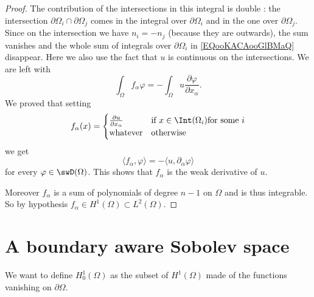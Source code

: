 \begin{proof}
    The contribution of the intersections in this integral is double : the intersection \( \partial\Omega_i\cap\partial\Omega_j\) comes in the integral over \( \partial\Omega_i\) and in the one over \( \partial\Omega_j\). Since on the intersection we have \( n_i=-n_j\) (because they are outwards), the sum vanishes and the whole sum of integrals over \( \partial\Omega_i\) in \eqref{EQooKACAooGlBMaQ} disappear. Here we also use the fact that \( u\) is continuous on the intersections. We are left with
    \begin{equation}
        \int_{\Omega}f_{\alpha}\varphi=-\int_{\Omega}u\frac{ \partial \varphi }{ \partial x_{\alpha} }. 
    \end{equation}
    We proved that setting
    \begin{equation}
        f_{\alpha}(x)=\begin{cases}
            \frac{ \partial u }{ \partial x_{\alpha} }    &   \text{if } x\in\Int(\Omega_i) \text{for some }i\\
            \text{whatever}    &    \text{otherwise }
        \end{cases}
    \end{equation}
    we get
    \begin{equation}
        \langle f_{\alpha}, \varphi\rangle =-\langle u, \partial_{\alpha}\varphi\rangle 
    \end{equation}
    for every \( \varphi\in\swD(\Omega)\). This shows that \( f_{\alpha}\) is the weak derivative of \( u\). 

    Moreover \( f_{\alpha}\) is a sum of polynomials of degree \( n-1\) on \( \Omega\) and is thus integrable. So by hypothesis \( f_{\alpha}\in H^1(\Omega)\subset L^2(\Omega)\).
\end{proof}

\section{A boundary aware Sobolev space}

We want to define \( H_0^1(\Omega)\) as the subset of \( H^1(\Omega)\) made of the functions vanishing on \( \partial \Omega\). 

